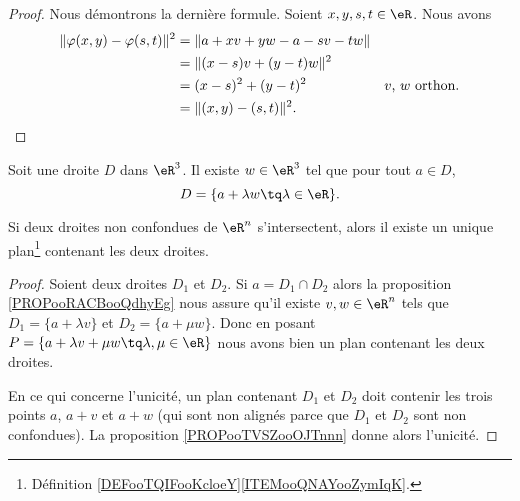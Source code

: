 \begin{proof}
	Nous démontrons la dernière formule. Soient \( x,y,s,t\in \eR\). Nous avons
	\begin{subequations}
		\begin{align}
			\| \varphi(x,y)-\varphi(s,t) \|^2 & =\| a+xv+yw-a-sv-tw \|                                 \\
			                                  & =\| (x-s)v+(y-t)w \|^2                                 \\
			                                  & =(x-s)^2+(y-t)^2       & \text{\( v\), \( w\) orthon.} \\
			                                  & =\| (x,y)-(s,t) \|^2.
		\end{align}
	\end{subequations}
\end{proof}

\begin{proposition}	\label{PROPooRACBooQdhyEg}
	Soit une droite \( D\) dans \( \eR^3\). Il existe \( w\in \eR^3\) tel que pour tout \( a\in D\),
	\begin{equation}
		D=\{ a+\lambda w\tq \lambda\in \eR \}.
	\end{equation}
\end{proposition}


\begin{proposition}	\label{PROPooQZGVooLTtyQT}
	Si deux droites non confondues de \( \eR^n\) s'intersectent, alors il existe un unique plan\footnote{Définition \ref{DEFooTQIFooKcloeY}\ref{ITEMooQNAYooZymIqK}.} contenant les deux droites.
\end{proposition}

\begin{proof}
	Soient deux droites \( D_1\) et \( D_2\). Si \( a=D_1\cap D_2\) alors la proposition \ref{PROPooRACBooQdhyEg} nous assure qu'il existe \( v,w\in \eR^n\) tels que \( D_1=\{ a+\lambda v \}\) et \( D_2=\{ a+\mu w \}\). Donc en posant \( P=\{ a+\lambda v+\mu w\tq \lambda,\mu\in \eR \}\) nous avons bien un plan contenant les deux droites.

	En ce qui concerne l'unicité, un plan contenant \( D_1\) et \( D_2\) doit contenir les trois points \( a\), \( a+v\) et \( a+w\) (qui sont non alignés parce que \( D_1\) et \( D_2\) sont non confondues). La proposition \ref{PROPooTVSZooOJTnnn} donne alors l'unicité.
\end{proof}



